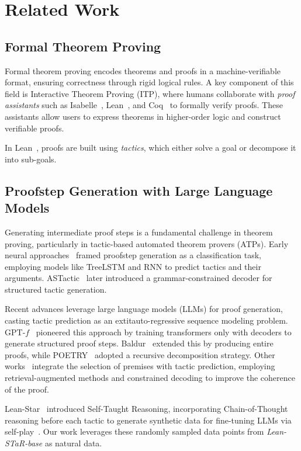 \section{Related Work}
\subsection{Formal Theorem Proving}
Formal theorem proving encodes theorems and proofs in a machine-verifiable format, ensuring correctness through rigid logical rules. A key component of this field is Interactive Theorem Proving (ITP), where humans collaborate with 	\textit{proof assistants} such as Isabelle~\cite{wenzel2008isabelle}, Lean~\cite{de2015lean}, and Coq~\cite{coq} to formally verify proofs. These assistants allow users to express theorems in higher-order logic and construct verifiable proofs.

In Lean~\cite{de2015lean}, proofs are built using \textit{tactics}, which either solve a goal or decompose it into sub-goals.

\subsection{Proofstep Generation with Large Language Models}  
Generating intermediate proof steps is a fundamental challenge in theorem proving, particularly in tactic-based automated theorem provers (ATPs). Early neural approaches~\citep{holophrasm, gamepad, holist, graph_representation, proverbot} framed proofstep generation as a classification task, employing models like TreeLSTM and RNN to predict tactics and their arguments. ASTactic~\citep{coqgym} later introduced a grammar-constrained decoder for structured tactic generation.

Recent advances leverage large language models (LLMs) for proof generation, casting tactic prediction as an 	extit{auto-regressive sequence modeling} problem. GPT-$f$~\citep{gptf} pioneered this approach by training transformers only with decoders to generate structured proof steps. Baldur~\citep{baldur} extended this by producing entire proofs, while POETRY~\citep{recursive} adopted a recursive decomposition strategy. Other works~\citep{rag_tactic, ps_formal, naturalprover, thor, leandojo} integrate the selection of premises with tactic prediction, employing retrieval-augmented methods and constrained decoding to improve the coherence of the proof.

Lean-Star~\cite{lean-star} introduced Self-Taught Reasoning, incorporating Chain-of-Thought~\cite{wei2023chainofthoughtpromptingelicitsreasoning} reasoning before each tactic to generate synthetic data for fine-tuning LLMs via self-play~\cite{chen2024selfplayfinetuningconvertsweak}. Our work leverages these randomly sampled data points from \textit{Lean-STaR-base} as natural data.

